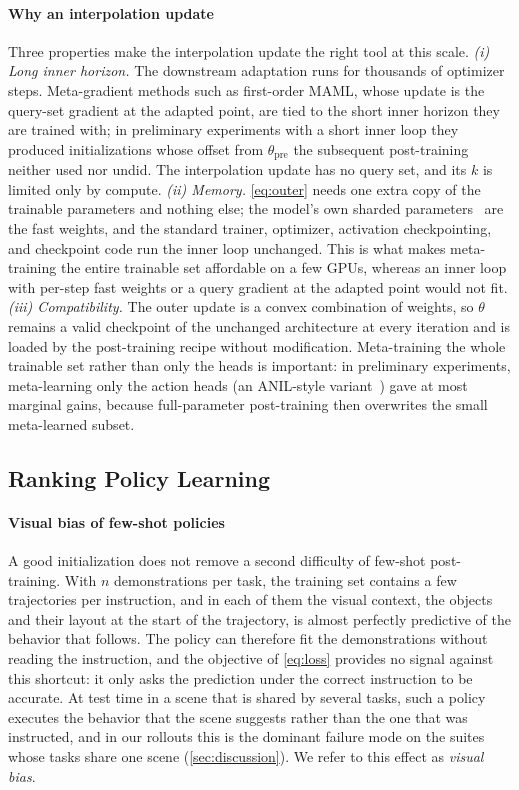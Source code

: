 \paragraph{Why an interpolation update}
Three properties make the interpolation update the right tool at this scale.
\emph{(i) Long inner horizon.}
The downstream adaptation runs for thousands of optimizer steps.
Meta-gradient methods such as first-order MAML, whose update is the query-set gradient at the adapted point, are tied to the short inner horizon they are trained with; in preliminary experiments with a short inner loop they produced initializations whose offset from $\theta_{\mathrm{pre}}$ the subsequent post-training neither used nor undid.
The interpolation update has no query set, and its $k$ is limited only by compute.
\emph{(ii) Memory.}
\cref{eq:outer} needs one extra copy of the trainable parameters and nothing else; the model's own sharded parameters~\cite{zhao2023fsdp} are the fast weights, and the standard trainer, optimizer, activation checkpointing, and checkpoint code run the inner loop unchanged.
This is what makes meta-training the entire trainable set affordable on a few GPUs, whereas an inner loop with per-step fast weights or a query gradient at the adapted point would not fit.
\emph{(iii) Compatibility.}
The outer update is a convex combination of weights, so $\theta$ remains a valid checkpoint of the unchanged architecture at every iteration and is loaded by the post-training recipe without modification.
Meta-training the whole trainable set rather than only the heads is important: in preliminary experiments, meta-learning only the action heads (an ANIL-style variant~\cite{raghu2020anil}) gave at most marginal gains, because full-parameter post-training then overwrites the small meta-learned subset.

\subsection{Ranking Policy Learning}
\label{sec:rpl}

\paragraph{Visual bias of few-shot policies}
A good initialization does not remove a second difficulty of few-shot post-training.
With $n$ demonstrations per task, the training set contains a few trajectories per instruction, and in each of them the visual context, the objects and their layout at the start of the trajectory, is almost perfectly predictive of the behavior that follows.
The policy can therefore fit the demonstrations without reading the instruction, and the objective of \cref{eq:loss} provides no signal against this shortcut: it only asks the prediction under the correct instruction to be accurate.
At test time in a scene that is shared by several tasks, such a policy executes the behavior that the scene suggests rather than the one that was instructed, and in our rollouts this is the dominant failure mode on the suites whose tasks share one scene (\cref{sec:discussion}).
We refer to this effect as \emph{visual bias}.

